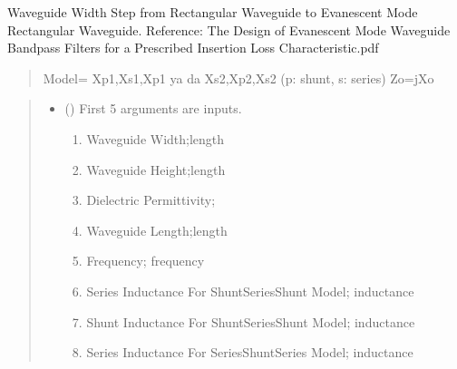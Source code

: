 \documentclass[letterpaper,10pt,english]{sphinxmanual}
\begin{document}
\begin{fulllineitems}
\label{\detokenize{components:components.EvanescentWGEquivalent}}
\pysigstartsignatures
{}
\pysigstopsignatures
\sphinxAtStartPar
Waveguide Width Step from Rectangular Waveguide to Evanescent Mode Rectangular Waveguide.
Reference:  The Design of Evanescent Mode Waveguide Bandpass Filters for a Prescribed Insertion Loss Characteristic.pdf
\begin{quote}

\sphinxAtStartPar
Model= Xp1,Xs1,Xp1 ya da Xs2,Xp2,Xs2 (p: shunt, s: series)
Zo=jXo
\end{quote}
\begin{quote}\begin{description}
\begin{itemize}
\item {}
\sphinxAtStartPar
{} () \textendash{}
\sphinxAtStartPar
First 5 arguments are inputs.
\begin{enumerate}
%
\item {}
\sphinxAtStartPar
Waveguide Width;length

\item {}
\sphinxAtStartPar
Waveguide Height;length

\item {}
\sphinxAtStartPar
Dielectric Permittivity;

\item {}
\sphinxAtStartPar
Waveguide Length;length

\item {}
\sphinxAtStartPar
Frequency; frequency

\item {}
\sphinxAtStartPar
Series Inductance For Shunt\sphinxhyphen{}Series\sphinxhyphen{}Shunt Model; inductance

\item {}
\sphinxAtStartPar
Shunt Inductance For Shunt\sphinxhyphen{}Series\sphinxhyphen{}Shunt Model; inductance

\item {}
\sphinxAtStartPar
Series Inductance For Series\sphinxhyphen{}Shunt\sphinxhyphen{}Series Model; inductance


\end{enumerate}
\end{itemize}
\end{description}
\end{quote}
\end{fulllineitems}
\end{document}
